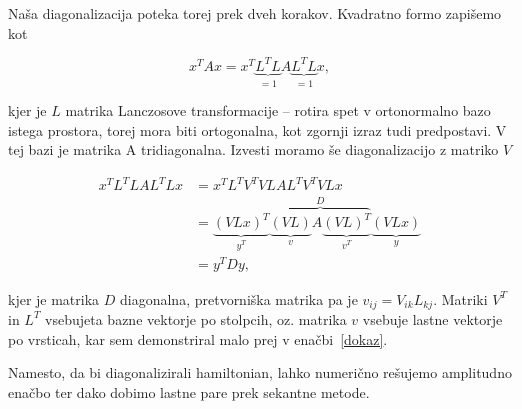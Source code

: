 \documentclass[a4 paper, 12pt]{article}
\begin{document}
Naša diagonalizacija poteka torej prek dveh korakov. Kvadratno formo zapišemo kot

\[
	x^TAx = x^T \underbrace{L^T L}_{= 1} A \underbrace{L^T L}_{= 1} x,
\]

kjer je $L$ matrika Lanczosove transformacije -- rotira spet v ortonormalno bazo istega prostora, torej mora biti ortogonalna, kot zgornji
izraz tudi predpostavi. V tej bazi je matrika A tridiagonalna. Izvesti moramo še diagonalizacijo z matriko $V$

\begin{align*}
	x^T L^T L A L^T L x &= x^T L^T V^T V L A L^T V^T V L x \\
		&= \underbrace{(VLx)^T}_{y^T} \overbrace{\underbrace{(VL)}_{v} A \underbrace{(VL)^T}_{v^T}}^{D} \underbrace{(VLx)}_{y} \\
		&= y^T D y,
\end{align*}

kjer je matrika $D$ diagonalna, pretvorniška matrika pa je $v_{ij} = V_{ik}L_{kj}$. Matriki $V^T$ in $L^T$ vsebujeta bazne
vektorje po stolpcih, oz. matrika $v$ vsebuje lastne vektorje po vrsticah, kar sem demonstriral malo prej v
enačbi~\eqref{dokaz}.

Namesto, da bi diagonalizirali hamiltonian, lahko numerično rešujemo amplitudno enačbo ter dako dobimo lastne pare prek
sekantne metode.
\end{document}
